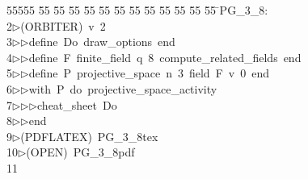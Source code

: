 %
%
\begin{tabbing}
55555 \= 55 \= 55 \= 55 \= 55 \= 55 \= 55 \= 55 \= 55 \= 55 \= 55 \= 55 \= 55 \= \>PG\_3\_8:\\[0pt]
2\>$\triangleright$\>(ORBITER)\ v\ 2\ \\[0pt]
3\>$\triangleright$\>$\triangleright$\>define\ Do\ draw\_options\ end\ \\[0pt]
4\>$\triangleright$\>$\triangleright$\>define\ F\ finite\_field\ q\ 8\ compute\_related\_fields\ end\ \\[0pt]
5\>$\triangleright$\>$\triangleright$\>define\ P\ projective\_space\ n\ 3\ field\ F\ v\ 0\ end\ \\[0pt]
6\>$\triangleright$\>$\triangleright$\>with\ P\ do\ projective\_space\_activity\ \\[0pt]
7\>$\triangleright$\>$\triangleright$\>$\triangleright$\>cheat\_sheet\ Do\ \\[0pt]
8\>$\triangleright$\>$\triangleright$\>end\\[0pt]
9\>$\triangleright$\>(PDFLATEX)\ PG\_3\_8tex\ \\[0pt]
10\>$\triangleright$\>(OPEN)\ PG\_3\_8pdf\\[0pt]
11\>\end{tabbing}
